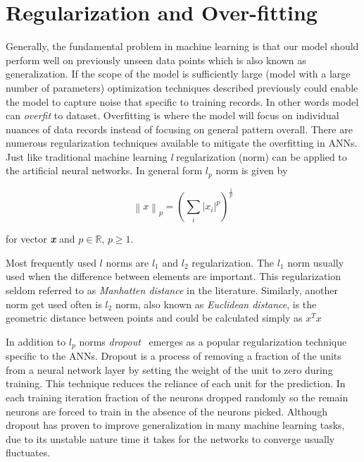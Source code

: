 \section{Regularization and Over-fitting} \label{sec:regularization}
Generally, the fundamental problem in machine learning is that our model should perform well on previously unseen data points which is also known as generalization.
If the scope of the model is sufficiently large (model with a large number of parameters) optimization techniques described previously could enable the model to capture noise that specific to training records. 
In other words model can \emph{overfit} to dataset.
Overfitting is where the model will focus on individual nuances of data records instead of focusing on general pattern overall.
There are numerous regularization techniques available to mitigate the overfitting in ANNs.
Just like traditional machine learning \textit{l} regularization (norm) can be applied to the artificial neural networks.
In general form $l_p$ norm is given by

\begin{equation}
  \left\lVert x \right\rVert_p = \left(\sum_i \left\lvert x_i \right\rvert^p \right) ^{\frac{1}{p}}
\end{equation}

for vector \textbf{\textit{x}} and $p \in \mathbb{R}$, $p \geq 1$.

Most frequently used $l$ norms are $l_1$ and $l_2$ regularization.
The $l_1$ norm usually used when the difference between elements are important. 
This regularization seldom referred to as \emph{Manhatten distance} in the literature.
Similarly, another norm get used often is $l_2$ norm, also known as \emph{Euclidean distance}, is the geometric distance between points and could be calculated simply as $x^Tx$

In addition to $l_p$ norms \emph{dropout}~\cite{dropout} emerges as a popular regularization technique specific to the ANNs.
Dropout is a process of removing a fraction of the units from a neural network layer by setting the weight of the unit to zero during training.
This technique reduces the reliance of each unit for the prediction.
In each training iteration fraction of the neurons dropped randomly so the remain neurons are forced to train in the absence of the neurons picked.
Although dropout has proven to improve generalization in many machine learning tasks, due to its unstable nature time it takes for the networks to converge usually fluctuates.



